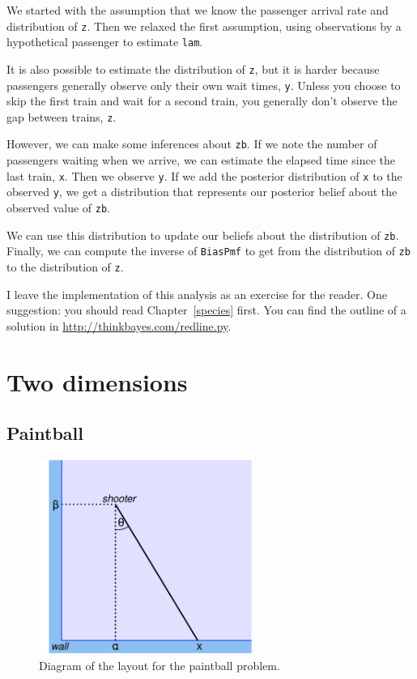 \documentclass[12pt]{book}
\begin{document}
We started with the assumption that we know the passenger arrival
rate and distribution of {\tt z}.  Then we relaxed the first assumption,
using observations by a hypothetical passenger to estimate
{\tt lam}.

It is also possible to estimate the
distribution of {\tt z}, but it is harder because passengers generally
observe only their own wait times, {\tt y}.  Unless you choose to skip
the first train and wait for a second train, you generally don't
observe the gap between trains, {\tt z}.

However, we can make some inferences about {\tt zb}.  If we note
the number of passengers waiting when we arrive, we can estimate
the elapsed time since the last train, {\tt x}.  Then we observe
{\tt y}.  If we add the posterior distribution of {\tt x} to
the observed {\tt y}, we get a distribution that represents
our posterior belief about the observed value of {\tt zb}.

We can use this distribution to update our beliefs about the
distribution of {\tt zb}.  Finally, we can compute the
inverse of {\tt BiasPmf} to get from the distribution of {\tt zb}
to the distribution of {\tt z}.

I leave the implementation of this analysis as an exercise for the
reader.  One suggestion: you should read Chapter~\ref{species} first.
You can find the outline of
a solution in \url{http://thinkbayes.com/redline.py}.


\chapter{Two dimensions}
\label{paintball}

\section{Paintball}

\begin{figure}
\centerline{\includegraphics[height=2.5in]{figs/paintball.pdf}}
\caption{Diagram of the layout for the paintball problem.}
\label{fig.paintball}
\end{figure}
\end{document}

